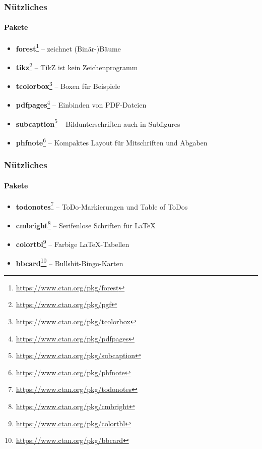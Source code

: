 
\begin{frame}
\frametitle{Nützliches}
\framesubtitle{Pakete}
\begin{itemize}
  \item \textbf{forest}\footnote{\url{https://www.ctan.org/pkg/forest}} -- zeichnet (Binär-)Bäume \\
  \item \textbf{tikz}\footnote{\url{https://www.ctan.org/pkg/pgf}} -- \glqq{}TikZ ist kein Zeichenprogramm\grqq \\
  \item \textbf{tcolorbox}\footnote{\url{https://www.ctan.org/pkg/tcolorbox}} -- Boxen für Beispiele \\
  \item \textbf{pdfpages}\footnote{\url{https://www.ctan.org/pkg/pdfpages}} -- Einbinden von PDF-Dateien \\
  \item \textbf{subcaption}\footnote{\url{https://www.ctan.org/pkg/subcaption}} -- Bildunterschriften auch in Subfigures \\
  \item \textbf{phfnote}\footnote{\url{https://www.ctan.org/pkg/phfnote}} -- Kompaktes Layout für Mitschriften und Abgaben \\
\end{itemize}
\end{frame}


\begin{frame}
\frametitle{Nützliches}
\framesubtitle{Pakete}
\begin{itemize}
  \item \textbf{todonotes}\footnote{\url{https://www.ctan.org/pkg/todonotes}} -- ToDo-Markierungen und Table of ToDos \\
  \item \textbf{cmbright}\footnote{\url{https://www.ctan.org/pkg/cmbright}} -- Serifenlose Schriften für \LaTeX \\
  \item \textbf{colortbl}\footnote{\url{https://www.ctan.org/pkg/colortbl}} -- Farbige \LaTeX -Tabellen \\
  \item \textbf{bbcard}\footnote{\url{https://www.ctan.org/pkg/bbcard}} -- Bullshit-Bingo-Karten \\
\end{itemize}
\end{frame}

